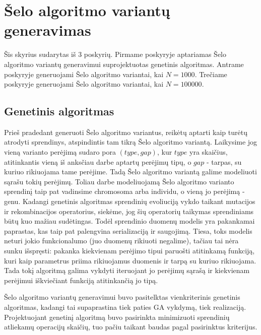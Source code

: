 \documentclass{VUMIFInfKursinis}
\begin{document}
\section{Šelo algoritmo variantų generavimas}

Šis skyrius sudarytas iš 3 poskyrių.
Pirmame poskyryje aptariamas Šelo algoritmo variantų generavimui suprojektuotas genetinis algoritmas.
Antrame poskyryje generuojami Šelo algoritmo variantai, kai $N = 1000$.
Trečiame poskyryje generuojami Šelo algoritmo variantai, kai $N = 100000$.

\subsection{Genetinis algoritmas}

Prieš pradedant generuoti Šelo algoritmo variantus, reikėtų aptarti kaip turėtų atrodyti sprendinys, atspindintis tam tikrą Šelo algoritmo variantą.
Laikysime jog vieną varianto perėjimą sudaro pora $(type, gap)$, kur $type$ yra skaičius, atitinkantis vieną iš anksčiau darbe aptartų perėjimų tipų,
o $gap$ - tarpas, su kuriuo rikiuojama tame perėjime.
Tadą Šelo algoritmo variantą galime modeliuoti sąrašu tokių perėjimų.
Toliau darbe modeliuojamą Šelo algoritmo varianto sprendinį taip pat vadinsime chromosoma arba individu, o vieną jo perėjimą - genu.
Kadangi genetinis algoritmas sprendinių evoliuciją vykdo taikant mutacijos ir rekombinacijos operatorius, siekėme, jog šių operatorių taikymas sprendiniams būtų kuo mažiau sudėtingas.
Todėl sprendinio duomenų modelis yra pakankamai paprastas, kas taip pat palengvina serializaciją ir saugojimą.
Tiesa, toks modelis neturi jokio funkcionalumo (juo duomenų rikiuoti negalime), tačiau tai nėra sunku išspręsti: pakanka kiekvienam perėjimo tipui
paruošti atitinkamą funkciją, kuri kaip parametrus priima rikiuojamus duomenis ir tarpą su kuriuo rikiuojama.
Tada tokį algoritmą galima vykdyti iteruojant jo perėjimų sąrašą ir kiekvienam perėjimui iškviečiant funkciją atitinkančią jo tipą.

Šelo algoritmo variantų generavimui buvo pasitelktas vienkriterinis genetinis algoritmas,
kadangi tai supaprastina tiek paties GA vykdymą, tiek realizaciją.
Projektuojant genetinį algoritmą buvo pasirinkta minimizuoti sprendinių atliekamų operacijų skaičių,
tuo pačiu taikant baudas pagal pasirinktus kriterijus.
\end{document}
